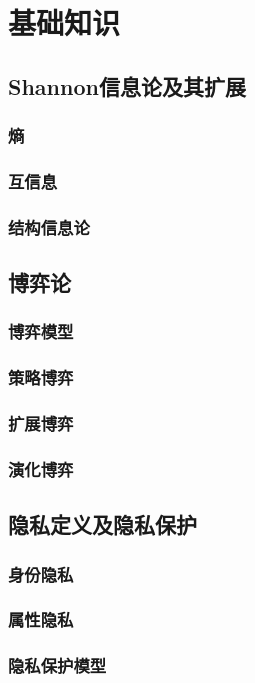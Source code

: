 \chapter{基础知识}
\label{chap:preliminary}


\section{Shannon信息论及其扩展}

\subsection{熵}
\subsection{互信息}
\subsection{结构信息论}

\section{博弈论}
\subsection{博弈模型}
\subsection{策略博弈}
\subsection{扩展博弈}
\subsection{演化博弈}


\section{隐私定义及隐私保护}
\subsection{身份隐私}
\subsection{属性隐私}
\subsection{隐私保护模型}

